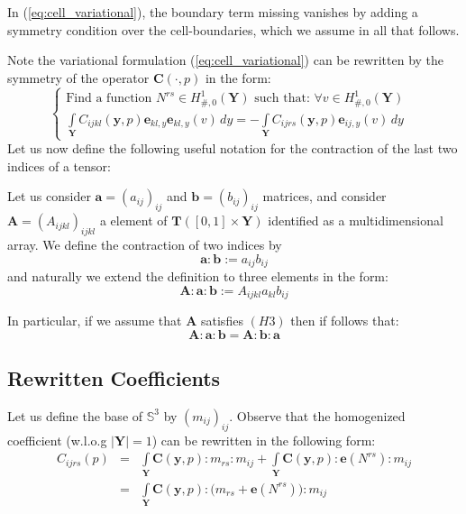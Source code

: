 \begin{rem}
In (\ref{eq:cell_variational}), the boundary term missing vanishes by adding a symmetry condition over the cell-boundaries, which we assume in all that follows.
\end{rem}
Note the variational formulation (\ref{eq:cell_variational}) can be rewritten by the symmetry of the operator $\mathbf{C}(\cdot,p)$ in the form:
\begin{equation}
    \label{eq:cell_symmetric}
    \left \{
    \begin{array}{cc}
        \text{Find a function } N^{rs} \in H^1_{\#,0}(\mathbf{Y}) \text{ such that: } \forall v \in H^1_{\#, 0}(\mathbf{Y})&\\
        \int\limits_{\mathbf{Y}} C_{ijkl}(\mathbf{y},p)\mathbf{e}_{kl,y} \mathbf{e}_{kl,y}(v)\,dy = -\int\limits_{\mathbf{Y}} C_{ijrs}(\mathbf{y},p) \mathbf{e}_{ij,y}(v)\,dy & 
    \end{array}
    \right.
\end{equation}
Let us now define the following useful notation for the contraction of the last two indices of a tensor:
\begin{defn}
Let us consider $\mathbf{a} = (a_{ij})_{ij}$ and $\mathbf{b} = (b_{ij})_{ij}$ matrices, and consider $\mathbf{A}=(A_{ijkl})_{ijkl}$ a element of $\mathbf{T}([0,1]\times \mathbf{Y})$ identified as a multidimensional array. We define the contraction of two indices by
\begin{equation*}
    \mathbf{a}:\mathbf{b} := a_{ij}b_{ij}
\end{equation*}
and naturally we extend the definition to three elements in the form:
\begin{equation*}
    \mathbf{A}:\mathbf{a}:\mathbf{b} := A_{ijkl}a_{kl}b_{ij}
\end{equation*}
\end{defn}
\begin{rem}
In particular, if we assume that $\mathbf{A}$ satisfies $(H3)$ then if follows that:
\begin{equation}
    \mathbf{A}: \mathbf{a}:\mathbf{b}= \mathbf{A}:\mathbf{b}:\mathbf{a}
\end{equation}
\end{rem}

\subsection{Rewritten Coefficients}
Let us define the base of $\mathbb{S}^3$ by $(m_{ij})_{ij}$. Observe that the homogenized coefficient (w.l.o.g $\vert \mathbf{Y} \vert = 1$) can be rewritten in the following form:
\begin{equation}
    \label{eq:effective_coef}
    \begin{array}{ccc}
        C_{ijrs}(p) &=& \int\limits_{\mathbf{Y}} \mathbf{C}(\mathbf{y},p):m_{rs}:m_{ij} + \int\limits_{\mathbf{Y}} \mathbf{C}(\mathbf{y},p):\mathbf{e}(N^{rs}):m_{ij} \\
         &=&\int\limits_{\mathbf{Y}} \mathbf{C}(\mathbf{y},p):\big(m_{rs} + \mathbf{e}(N^{rs})\big):m_{ij}
    \end{array}
\end{equation}

